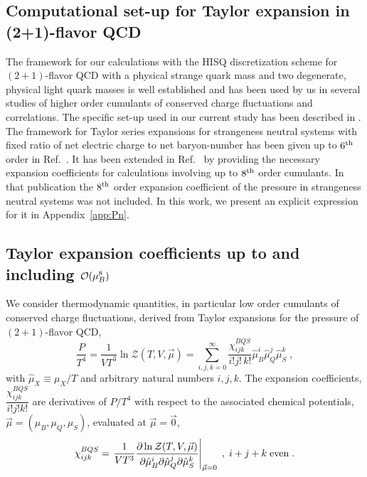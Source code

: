 \documentclass[pdflatex,prd,twocolumn,showpacs,superscriptaddress,nofootinbib]{revtex4-1}
\newcommand \hmu {\hat{\mu}}
\begin{document}
\subsection{Computational set-up for Taylor expansion in (2+1)-flavor QCD}
The framework for our calculations with the HISQ \cite{Follana:2006rc} discretization scheme for $(2+1)$-flavor 
QCD with a physical strange quark mass and two degenerate, physical light quark masses
is well established and has been used by us in several studies of higher order
cumulants of conserved charge fluctuations and correlations. The specific set-up
used in our current study has been described in \cite{Bazavov:2020bjn}. The framework for Taylor series expansions for strangeness neutral systems with fixed ratio of net electric charge
to net baryon-number has been given
up to $6^{\rm th}$ order in Ref.~\cite{Bazavov:2017dus}. It has been extended
in Ref.~\cite{Bazavov:2020bjn} by providing the 
necessary expansion coefficients for calculations involving up to $8^{\rm th}$ order cumulants. In that publication 
the $8^{\rm th}$ order expansion coefficient  of the pressure in strangeness neutral systems was not included. In this work, we present an explicit expression for it in Appendix~\ref{app:Pn}.

\subsection{Taylor expansion coefficients up to and including
\boldmath ${\cal O}(\mu_B^8)$}

We consider thermodynamic quantities, in particular low order cumulants of conserved
charge fluctuations, derived from Taylor expansions for the 
pressure of $(2+1)$-flavor QCD,
\begin{equation}
	\frac{P}{T^4} = \frac{1}{VT^3}\ln\mathcal{Z}(T,V,\vec{\mu}) = \sum_{i,j,k=0}^\infty%
\frac{\chi_{ijk}^{BQS}}{i!j!\,k!} \hmu_B^i \hmu_Q^j \hmu_S^k \; ,
\label{Pdefinition}
\end{equation}
with $\hat{\mu}_X\equiv \mu_X/T$ and arbitrary natural numbers $i,j,k$.
The expansion coefficients, $\dfrac{\chi_{ijk}^{BQS}}{i!j!k!}$ are 
derivatives of $P/T^4$ with respect to the associated chemical potentials,
$\vec{\mu}=(\mu_B, \mu_Q, \mu_S)$, evaluated at
$\vec{\mu}=\vec{0}$,
\begin{equation}
\chi_{ijk}^{BQS} =\left. 
\frac{1}{VT^3}\frac{\partial \ln\mathcal{Z}(T,V,\vec{\mu}) }{\partial\hmu_B^i \partial\hmu_Q^j \partial\hmu_S^k}\right|_{\vec{\mu}=0} \; ,
\; i+j+k\; {\rm even} \; .
\label{suscept}
\end{equation}
\end{document}
